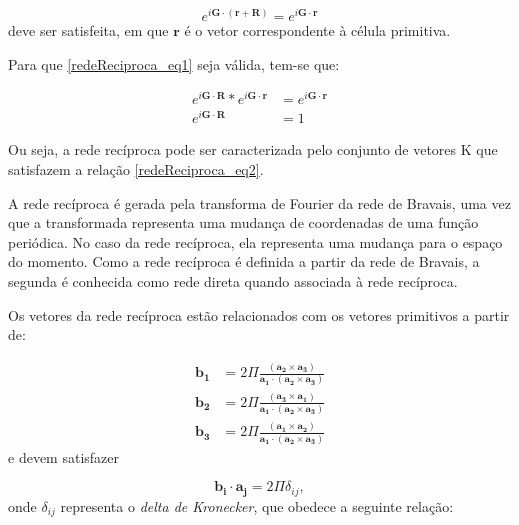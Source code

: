       \begin{equation}\label{redeReciproca_eq1}
        e^{i\mathbf{G}\cdot (\mathbf{r}+\mathbf{R})} = e^{i\mathbf{G}\cdot\mathbf{r}}
      \end{equation}
      deve ser satisfeita, em que $\mathbf{r}$ é o vetor correspondente à célula primitiva.

      Para que \eqref{redeReciproca_eq1} seja válida, tem-se que:

      \begin{align}\label{redeReciproca_eq2}
        e^{i\mathbf{G}\cdot\mathbf{R}}\ast e^{i\mathbf{G}\cdot\mathbf{r}} &= e^{i\mathbf{G}\cdot\mathbf{r}}\\
        e^{i\mathbf{G}\cdot\mathbf{R}}                                    &= 1
      \end{align}

      Ou seja, a rede recíproca pode ser caracterizada pelo conjunto de vetores K que satisfazem a relação \eqref{redeReciproca_eq2}. 
      
      A rede recíproca é gerada pela transforma de Fourier da rede de Bravais, uma vez que a transformada representa uma mudança de coordenadas de uma função periódica.\cite{qm_fis7} No caso da rede recíproca, ela representa uma mudança para o espaço do momento.\cite{qm_fis8} Como a rede recíproca é definida a partir da rede de Bravais, a segunda é conhecida como rede direta quando associada à rede recíproca.\cite{qm_fis5}
      
      Os vetores da rede recíproca estão relacionados com os vetores primitivos a partir de:
      
      \begin{align}\label{redeReciproca_eq3}
        \mathbf{b_{1}} &= 2 \Pi \frac{(\mathbf{a_{2}} \times \mathbf{a_{3}})} {\mathbf{a_{1}} \cdot (\mathbf{a_{2}} \times \mathbf{a_{3}})}\\
        \mathbf{b_{2}} &= 2 \Pi \frac{(\mathbf{a_{3}} \times \mathbf{a_{1}})} {\mathbf{a_{1}} \cdot (\mathbf{a_{2}} \times \mathbf{a_{3}})}\\
        \mathbf{b_{3}} &= 2 \Pi \frac{(\mathbf{a_{1}} \times \mathbf{a_{2}})} {\mathbf{a_{1}} \cdot (\mathbf{a_{2}} \times \mathbf{a_{3}})}
      \end{align}
      e devem satisfazer

      \begin{equation}\label{redeReciproca_eq4}
        \mathbf{b_{i}}\cdot \mathbf{a_{j}} = 2\Pi \delta_{ij},
      \end{equation}
      onde $\delta_{ij}$ representa o \textit{delta de Kronecker}, que obedece a seguinte relação:

